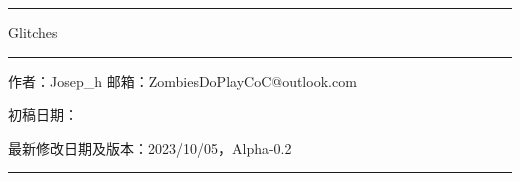 \begin{titlepage}
    \centering


    \rule{\textwidth}{1pt}   %
    \vspace{0.2\textheight}  %


    {\Huge Glitches}

    \vspace{0.01\textheight}   %

    \rule{0.4\textwidth}{0.4pt}  %

    \vspace{0.02\textheight}  %


    {\Large 作者：Josep\_h}
    \vfill
    {\Large 邮箱：ZombiesDoPlayCoC@outlook.com}\par
    {\large 初稿日期：}\par
    {\large 最新修改日期及版本：2023/10/05，Alpha-0.2}\par
    \vspace{0.1\textheight}  %


    \rule{\textwidth}{1pt}  %

\end{titlepage}